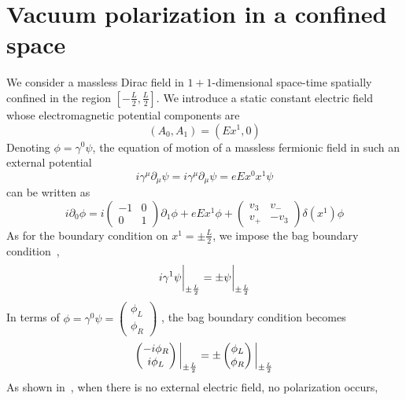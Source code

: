 \section{Vacuum polarization in a confined space}\label{sect-nef}
We consider a massless Dirac field in $1+1$-dimensional space-time spatially confined in the region $[-\frac L 2 , \frac L 2 ]$.
We introduce a static constant electric field whose electromagnetic potential components are 
\begin{equation*}
(A_0, A_1) = (E x^1, 0)
\end{equation*}
Denoting $\phi = \gamma^0\psi$, the equation of motion of a massless fermionic field in such an external potential 
\begin{equation*}
i\gamma^\mu\partial_\mu \psi = i\gamma^\mu\partial_\mu \psi = eEx^0 x^1 \psi
\end{equation*}
can be written as
\begin{equation*}
i\partial_0\phi = i \begin{pmatrix} -1 & 0 \\ 0 & 1 \end{pmatrix}\partial_1\phi
+ eEx^1\phi
+ \begin{pmatrix}
v_3 & v_- \\ v_+ & -v_3
\end{pmatrix}\delta(x^1)\phi
\end{equation*}
%
As for the boundary condition on $x^1 = \pm \frac L 2$, we impose the bag boundary condition~\cite{Chodos1974}, \ie 
\begin{equation*}
i\gamma^1 \psi \bigg\rvert_{\pm \frac{L}{2}} = \pm \psi \bigg\rvert_{\pm \frac{L}{2}}
\end{equation*}
In terms of $\phi = \gamma^0\psi = \begin{pmatrix} \phi_L \\ \phi_R \end{pmatrix}$
, the bag boundary condition becomes
\begin{equation}\label{vacuum-bagboundcond}
\begin{pmatrix}
-i \phi_R \\
i \phi_L
\end{pmatrix} \bigg\rvert_{\pm \frac{L}{2}} = \pm \begin{pmatrix}
\phi_L \\
\phi_R
\end{pmatrix} \bigg\rvert_{\pm \frac{L}{2}}
\end{equation}
%
As shown in~\cite{Zahn2015}, when there is no external electric field, no polarization occurs,
